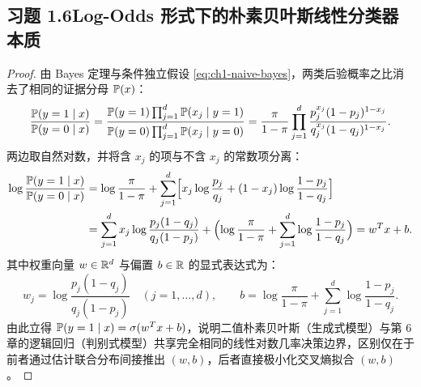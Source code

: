 \subsection*{习题 1.6\quad Log-Odds 形式下的朴素贝叶斯线性分类器本质}
\begin{proof}
由 Bayes 定理与条件独立假设 \eqref{eq:ch1-naive-bayes}，两类后验概率之比消去了相同的证据分母 $\mathbb{P}(x)$：
\[
  \frac{\mathbb{P}(y=1 \mid x)}{\mathbb{P}(y=0 \mid x)}
  = \frac{\mathbb{P}(y=1)\prod_{j=1}^d \mathbb{P}(x_j \mid y=1)}{\mathbb{P}(y=0)\prod_{j=1}^d \mathbb{P}(x_j \mid y=0)}
  = \frac{\pi}{1 - \pi} \prod_{j=1}^d \frac{p_j^{x_j}(1 - p_j)^{1 - x_j}}{q_j^{x_j}(1 - q_j)^{1 - x_j}}.
\]
两边取自然对数，并将含 $x_j$ 的项与不含 $x_j$ 的常数项分离：
\begin{align*}
  \log \frac{\mathbb{P}(y=1 \mid x)}{\mathbb{P}(y=0 \mid x)}
  &= \log \frac{\pi}{1 - \pi}
     + \sum_{j=1}^d \Bigl[x_j \log \frac{p_j}{q_j} + (1 - x_j)\log \frac{1 - p_j}{1 - q_j}\Bigr] \\
  &= \sum_{j=1}^d x_j \log \frac{p_j(1 - q_j)}{q_j(1 - p_j)}
     + \Bigl(\log \frac{\pi}{1 - \pi} + \sum_{j=1}^d \log \frac{1 - p_j}{1 - q_j}\Bigr)
   = w^T x + b.
\end{align*}
其中权重向量 $w \in \mathbb{R}^d$ 与偏置 $b \in \mathbb{R}$ 的显式表达式为：
\[
  w_j = \log \frac{p_j(1 - q_j)}{q_j(1 - p_j)} \quad (j=1,\dots,d), \qquad
  b = \log \frac{\pi}{1 - \pi} + \sum_{j=1}^d \log \frac{1 - p_j}{1 - q_j}.
\]
由此立得 $\mathbb{P}(y=1 \mid x) = \sigma(w^T x + b)$，说明二值朴素贝叶斯（生成式模型）与第 6 章的逻辑回归（判别式模型）共享完全相同的线性对数几率决策边界，区别仅在于前者通过估计联合分布间接推出 $(w, b)$，后者直接极小化交叉熵拟合 $(w, b)$。
\end{proof}

